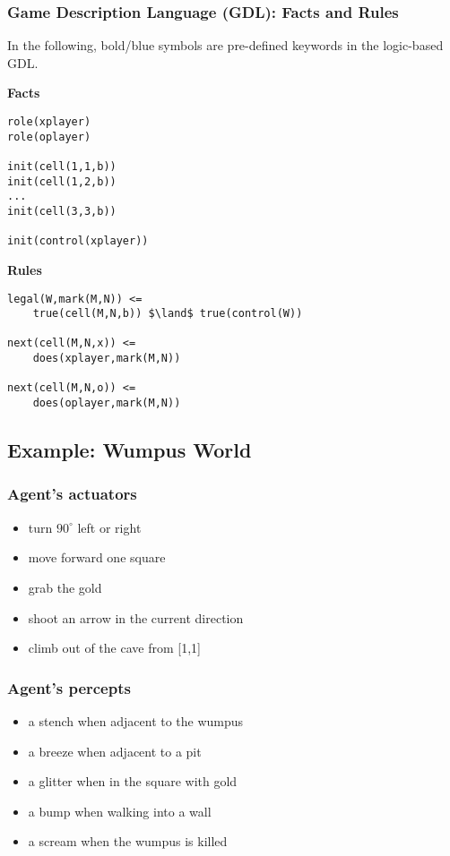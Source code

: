 \subsubsection{Game Description Language (GDL): Facts and Rules}
In the following, bold/blue symbols are pre-defined keywords in the logic-based
GDL.

\textbf{Facts}
\begin{lstlisting}[morekeywords={role, init}]
role(xplayer)
role(oplayer)

init(cell(1,1,b))
init(cell(1,2,b))
...
init(cell(3,3,b))

init(control(xplayer))
\end{lstlisting}

\textbf{Rules}
\begin{lstlisting}[morekeywords={legal, true, next, does}]
legal(W,mark(M,N)) <=
    true(cell(M,N,b)) $\land$ true(control(W))

next(cell(M,N,x)) <=
    does(xplayer,mark(M,N))

next(cell(M,N,o)) <=
    does(oplayer,mark(M,N))
\end{lstlisting}

\subsection{Example: Wumpus World}
\subsubsection{Agent's actuators}
\begin{itemize}
    \item turn $90^{\circ}$ left or right
    \item move forward one square
    \item grab the gold
    \item shoot an arrow in the current direction
    \item climb out of the cave from [1,1]
\end{itemize}

\subsubsection{Agent's percepts}
\begin{itemize}
    \item a stench when adjacent to the wumpus
    \item a breeze when adjacent to a pit
    \item a glitter when in the square with gold
    \item a bump when walking into a wall
    \item a scream when the wumpus is killed
\end{itemize}

